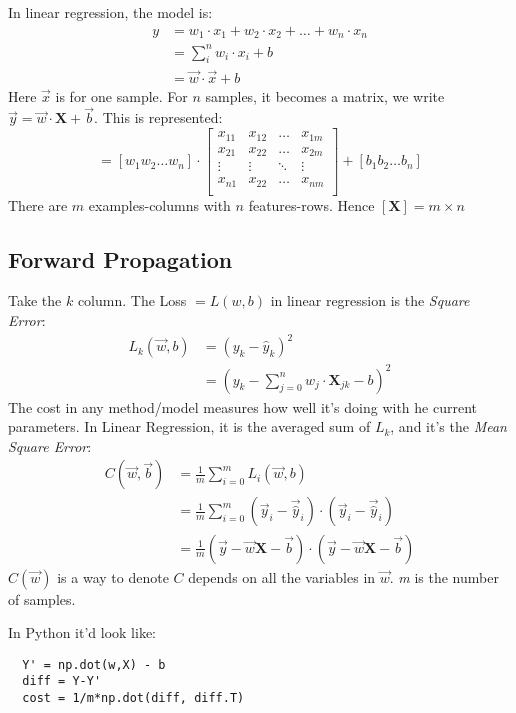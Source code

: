 In linear regression, the model is:
\begin{align*}
 y &= w_1\cdot x_1 + w_2\cdot x_2 +\ldots+ w_n\cdot x_n\\
   &= \sum_i^n w_i\cdot x_i + b \\
   &= \vec{w}\cdot\vec{x} + b
\end{align*}
Here $\vec{x}$ is for one sample. For $n$ samples, it becomes a matrix, we write $\vec{y} = \vec{w}\cdot\mathbf{X} + \vec{b}$. This is represented:
\begin{equation}
  [y_1 y_2 \ldots y_n] = 
  [w_1 w_2 \ldots w_n] \cdot
  \begin{bmatrix}
    x_{11} & x_{12} & \ldots & x_{1m}\\
    x_{21} & x_{22} & \ldots & x_{2m}\\
    \vdots & \vdots & \ddots & \vdots\\
    x_{n1} & x_{22} & \ldots & x_{nm}\\
  \end{bmatrix}
  + [b_1 b_2 \ldots b_n]
\end{equation}
There are $m$ examples-columns with $n$ features-rows. Hence $[\mathbf{X}] = m\times{}n$

\subsection{Forward Propagation}
Take the $k$ column. The Loss $= L(w,b)$ in linear regression is the \textit{Square Error}:
\begin{align*}
  L_k(\vec{w},b) &= (y_k - \hat{y}_k)^2\\
  &= (y_k - \sum_{j=0}^n w_j\cdot{}{\mathbf{X}}_{jk} - b)^2
\end{align*}
The cost in any method/model measures how well it's doing with he current parameters. In Linear Regression, it is the averaged sum of $L_k$, and it's the \textit{Mean Square Error}:
\begin{align}
  C(\vec{w}, \vec{b}) &= \frac{1}{m}\sum_{i=0}^m L_i(\vec{w}, b)\\
  &=\frac{1}{m}\sum_{i=0}^m (\vec{y}_i - \vec{\hat{y}}_i)\cdot{}(\vec{y}_i - \vec{\hat{y}}_i)\\
  &= \frac{1}{m} (\vec{y} - \vec{w}\mathbf{X} - \vec{b})\cdot{}(\vec{y} - \vec{w}\mathbf{X} - \vec{b})
\end{align}
$C(\vec{w})$ is a way to denote $C$ depends on all the variables in $\vec{w}$. \textit{m} is the number of samples.

In Python it'd look like:
\begin{center}
  \begin{BVerbatim}
  Y' = np.dot(w,X) - b
  diff = Y-Y' 
  cost = 1/m*np.dot(diff, diff.T)
  \end{BVerbatim}
\end{center}
